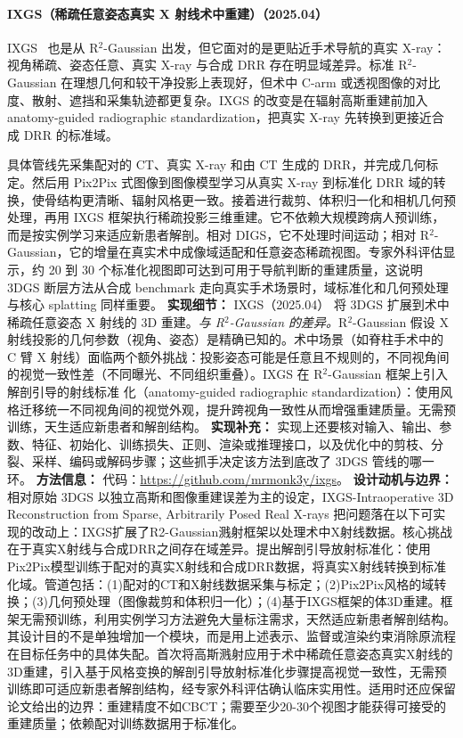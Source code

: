 \paragraph{IXGS（稀疏任意姿态真实 X 射线术中重建）（2025.04）}
IXGS~\cite{2504_14699} 也是从 R$^2$-Gaussian 出发，但它面对的是更贴近手术导航的真实 X-ray：视角稀疏、姿态任意、真实 X-ray 与合成 DRR 存在明显域差异。标准 R$^2$-Gaussian 在理想几何和较干净投影上表现好，但术中 C-arm 或透视图像的对比度、散射、遮挡和采集轨迹都更复杂。IXGS 的改变是在辐射高斯重建前加入 anatomy-guided radiographic standardization，把真实 X-ray 先转换到更接近合成 DRR 的标准域。

具体管线先采集配对的 CT、真实 X-ray 和由 CT 生成的 DRR，并完成几何标定。然后用 Pix2Pix 式图像到图像模型学习从真实 X-ray 到标准化 DRR 域的转换，使骨结构更清晰、辐射风格更一致。接着进行裁剪、体积归一化和相机几何预处理，再用 IXGS 框架执行稀疏投影三维重建。它不依赖大规模跨病人预训练，而是按实例学习来适应新患者解剖。相对 DIGS，它不处理时间运动；相对 R$^2$-Gaussian，它的增量在真实术中成像域适配和任意姿态稀疏视图。专家外科评估显示，约 20 到 30 个标准化视图即可达到可用于导航判断的重建质量，这说明 3DGS 断层方法从合成 benchmark 走向真实手术场景时，域标准化和几何预处理与核心 splatting 同样重要。
\textbf{实现细节：} IXGS（2025.04） 将 3DGS 扩展到术中稀疏任意姿态 X 射线的 3D 重建。\textit{与 R$^{2}$-Gaussian 的差异。}R$^{2}$-Gaussian 假设 X 射线投影的几何参数（视角、姿态）是精确已知的。术中场景（如脊柱手术中的 C 臂 X 射线）面临两个额外挑战：投影姿态可能是任意且不规则的，不同视角间的视觉一致性差（不同曝光、不同组织重叠）。IXGS 在 R$^{2}$-Gaussian 框架上引入解剖引导的射线标准 化（anatomy-guided radiographic standardization）：使用风格迁移统一不同视角间的视觉外观，提升跨视角一致性从而增强重建质量。无需预训练，天生适应新患者和解剖结构。
\textbf{实现补充：} 实现上还要核对输入、输出、参数、特征、初始化、训练损失、正则、渲染或推理接口，以及优化中的剪枝、分裂、采样、编码或解码步骤；这些抓手决定该方法到底改了 3DGS 管线的哪一环。
\textbf{方法信息：} 代码：\url{https://github.com/mrmonk3y/ixgs}。
\textbf{设计动机与边界：} 相对原始 3DGS 以独立高斯和图像重建误差为主的设定，IXGS-Intraoperative 3D Reconstruction from Sparse, Arbitrarily Posed Real X-rays 把问题落在以下可实现的改动上：IXGS扩展了R2-Gaussian溅射框架以处理术中X射线数据。核心挑战在于真实X射线与合成DRR之间存在域差异。提出解剖引导放射标准化：使用Pix2Pix模型训练于配对的真实X射线和合成DRR数据，将真实X射线转换到标准化域。管道包括：(1)配对的CT和X射线数据采集与标定；(2)Pix2Pix风格的域转换；(3)几何预处理（图像裁剪和体积归一化）；(4)基于IXGS框架的体3D重建。框架无需预训练，利用实例学习方法避免大量标注需求，天然适应新患者解剖结构。其设计目的不是单独增加一个模块，而是用上述表示、监督或渲染约束消除原流程在目标任务中的具体失配。首次将高斯溅射应用于术中稀疏任意姿态真实X射线的3D重建，引入基于风格变换的解剖引导放射标准化步骤提高视觉一致性，无需预训练即可适应新患者解剖结构，经专家外科评估确认临床实用性。适用时还应保留论文给出的边界：重建精度不如CBCT；需要至少20-30个视图才能获得可接受的重建质量；依赖配对训练数据用于标准化。

